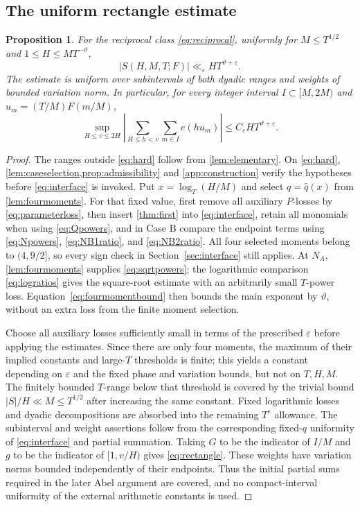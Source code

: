 \documentclass[11pt,reqno]{amsart}
\numberwithin{equation}{section}
\newtheorem{proposition}[proposition]{Proposition}
\theoremstyle{definition}
\theoremstyle{remark}
\newcommand{\eps}{\varepsilon}
\newcommand{\vth}{\vartheta}
\begin{document}
\subsection{The uniform rectangle estimate}
\begin{proposition}\label{prop:reciprocalsums}
For the reciprocal class \eqref{eq:reciprocal}, uniformly for
$M\le T^{1/2}$ and $1\le H\le MT^{-\vth}$,
\begin{equation}\label{eq:reciprocalbound}
 |S(H,M,T;F)|\ll_\eps HT^{\vth+\eps}.
\end{equation}
The estimate is uniform over subintervals of both dyadic ranges and weights of bounded variation norm. In particular, for every integer interval $I\subset[M,2M)$ and $u_m=(T/M)F(m/M)$,
\begin{equation}\label{eq:rectangle}
 \sup_{H\le v\le2H}
 \left|\sum_{H\le h<v}\sum_{m\in I}e(hu_m)\right|
 \le C_\eps H T^{\vth+\eps}.
\end{equation}
\end{proposition}
\begin{proof}
The ranges outside \eqref{eq:hard} follow from \cref{lem:elementary}.
On \eqref{eq:hard}, \cref{lem:caseselection,prop:admissibility} and \cref{app:construction} verify the hypotheses before \eqref{eq:interface} is invoked. Put $x=\log_T(H/M)$ and select $q=\widehat q(x)$ from \cref{lem:fourmoments}.
For that fixed value, first remove all auxiliary $P$-losses by \eqref{eq:parameterloss}, then insert \cref{thm:first} into \eqref{eq:interface}, retain all monomials when using \eqref{eq:Qpowers}, and in Case B compare the endpoint terms using \eqref{eq:Npowers}, \eqref{eq:NB1ratio}, and \eqref{eq:NB2ratio}.
All four selected moments belong to $(4,9/2]$, so every sign check in Section~\ref{sec:interface} still applies.
At $N_A$, \cref{lem:fourmoments} supplies \eqref{eq:sqrtpowers}; the logarithmic comparison \eqref{eq:logratios} gives the square-root estimate with an arbitrarily small $T$-power loss.
Equation~\eqref{eq:fourmomentbound} then bounds the main exponent by $\vth$, without an extra loss from the finite moment selection.

Choose all auxiliary losses sufficiently small in terms of the prescribed $\eps$ before applying the estimates.
Since there are only four moments, the maximum of their implied constants and large-$T$ thresholds is finite; this yields a constant depending on $\eps$ and the fixed phase and variation bounds, but not on $T,H,M$.
The finitely bounded $T$-range below that threshold is covered by the trivial bound $|S|/H\ll M\le T^{1/2}$ after increasing the same constant.
Fixed logarithmic losses and dyadic decompositions are absorbed into the remaining $T^\eps$ allowance.
The subinterval and weight assertions follow from the corresponding fixed-$q$ uniformity of \eqref{eq:interface} and partial summation.
Taking $G$ to be the indicator of $I/M$ and $g$ to be the indicator of $[1,v/H)$ gives \eqref{eq:rectangle}. These weights have variation norms bounded independently of their endpoints. Thus the initial partial sums required in the later Abel argument are covered, and no compact-interval uniformity of the external arithmetic constants is used.
\end{proof}
\end{document}
